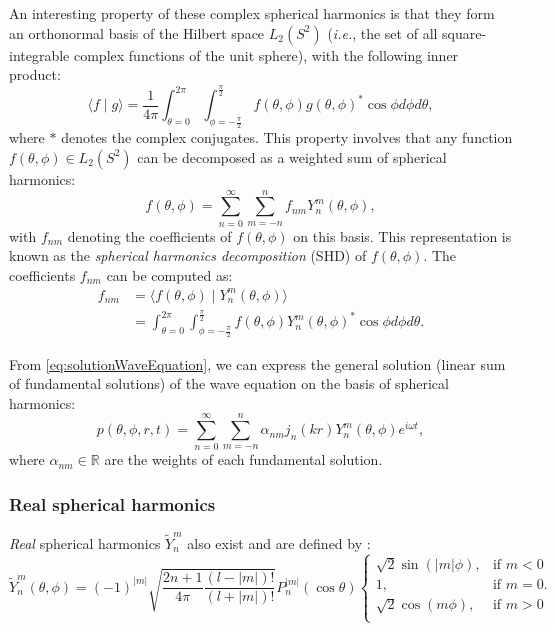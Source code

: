 An interesting property of these complex spherical harmonics is that they form an orthonormal basis of the Hilbert space $L_2(S^2)$ (\emph{i.e.}, the set of all square-integrable complex functions of the unit sphere), with the following inner product:
\begin{equation}
    \langle f \mid g \rangle = \frac{1}{4 \pi} \int_{\theta=0}^{2 \pi} \int_{\phi=-\frac{\pi}{2}}^{\frac{\pi}{2}} f(\theta,\phi) g(\theta,\phi)^* \cos \phi d \phi d \theta,
\end{equation}
where $*$ denotes the complex conjugates.
This property involves that any function $f(\theta,\phi)\in L_2(S^2)$ can be decomposed as a weighted sum of spherical harmonics:
\begin{equation}
    f(\theta,\phi) = \sum_{n=0}^{\infty} \sum_{m=-n}^{n} f_{nm} Y_n^m(\theta,\phi),
\end{equation}
with $f_{nm}$ denoting the coefficients of $f(\theta,\phi)$ on this basis. This representation is known as the \textit{spherical harmonics decomposition} (SHD) of $f(\theta,\phi)$. The coefficients $f_{nm}$ can be computed as:
\begin{equation}
    \begin{split}
    f_{nm} &= \langle f(\theta,\phi) \mid Y_n^m(\theta,\phi) \rangle \\
           &= \int_{\theta=0}^{2 \pi} \int_{\phi=-\frac{\pi}{2}}^{\frac{\pi}{2}} f(\theta,\phi) Y_n^m(\theta,\phi)^* \cos\phi d \phi d \theta.
    \end{split}
\end{equation}

From \eqref{eq:solutionWaveEquation}, we can express the general solution (linear sum of fundamental solutions) of the wave equation on the basis of spherical harmonics:
\begin{equation}\label{eqHOAdecomp}
    p(\theta,\phi,r,t) = \sum_{n=0}^{\infty} \sum_{m=-n}^n \alpha_{nm} j_n(kr) Y_n^m(\theta,\phi) e^{i \omega t},
\end{equation}
where $\alpha_{nm} \in \mathbb{R}$ are the weights of each fundamental solution. 

\subsubsection{Real spherical harmonics}
\label{sec:realSphericalHarmonics}

\textit{Real} spherical harmonics $\tilde{Y}_n^m$ also exist and are defined by \cite[p.~28]{jarrett_theory_2017}:
\begin{equation}
\label{eq:realSphericalHarmonicsDefinition}
    \tilde{Y}_n^m(\theta,\phi) = (-1)^{\lvert m \rvert} \sqrt{\frac{2n+1}{4 \pi} \frac{(l-\lvert m \rvert)!}{(l+\lvert m \rvert)!}} P_n^{\lvert m \rvert}(\cos\theta) 
    \begin{cases}
        \sqrt{2} \sin(\lvert m \rvert \phi), & \text{if $m<0$}\\
        1, & \text{if $m=0$}. \\
        \sqrt{2} \cos(m \phi), & \text{if $m>0$}\\
    \end{cases}
\end{equation}

